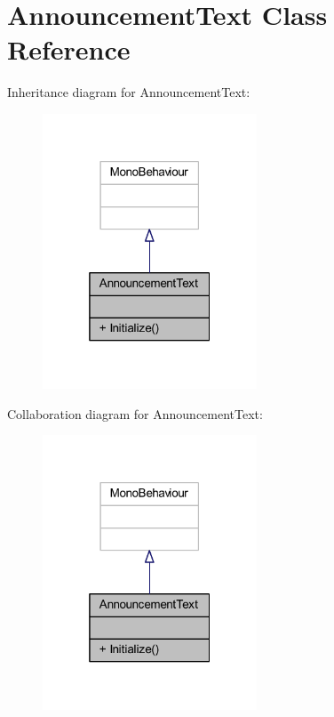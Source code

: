 \hypertarget{class_announcement_text}{}\section{Announcement\+Text Class Reference}
\label{class_announcement_text}


Inheritance diagram for Announcement\+Text\+:
\nopagebreak
\begin{figure}[H]
\begin{center}
\leavevmode
\includegraphics[width=181pt]{class_announcement_text__inherit__graph}
\end{center}
\end{figure}


Collaboration diagram for Announcement\+Text\+:
\nopagebreak
\begin{figure}[H]
\begin{center}
\leavevmode
\includegraphics[width=181pt]{class_announcement_text__coll__graph}
\end{center}
\end{figure}
